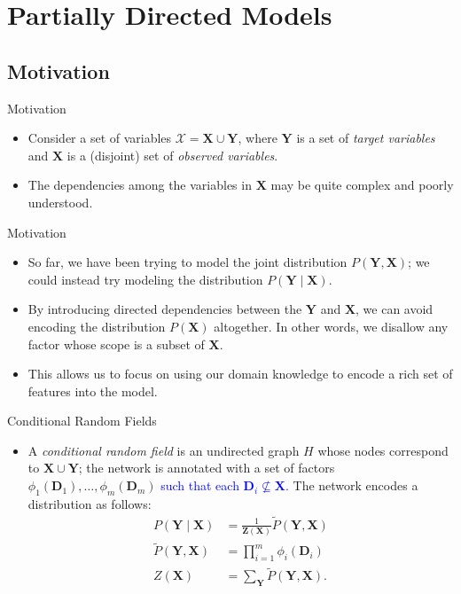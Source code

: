 \documentclass[11pt]{beamer}
\begin{document}
\section{Partially Directed Models \cite{pgmbook}}
\subsection{Motivation}

\begin{frame}{Motivation}
\begin{itemize}
	\item Consider a set of variables $\mathcal{X} = \boldsymbol{X} \cup
	\boldsymbol{Y}$, where $\boldsymbol{Y}$ is a set of \emph{target
	variables} and $\boldsymbol{X}$ is a (disjoint) set of \emph{observed
	variables}.
	\item The dependencies among the variables in $\boldsymbol{X}$ may be
	quite complex and poorly understood.
\end{itemize}
\end{frame}

\begin{frame}{Motivation}
\begin{itemize}
	\item So far, we have been trying to model the joint distribution
	$P(\boldsymbol{Y}, \boldsymbol{X})$; we could instead try modeling the
	distribution $P(\boldsymbol{Y} \;|\; \boldsymbol{X})$.
	\item By introducing directed dependencies between the $\boldsymbol{Y}$
	and $\boldsymbol{X}$, we can avoid encoding the distribution
	$P(\boldsymbol{X})$ altogether. In other words, we disallow any factor
	whose scope is a subset of $\boldsymbol{X}$.
	\item This allows us to focus on using our domain knowledge to encode a
	rich set of features into the model.
\end{itemize}
\end{frame}

\begin{frame}{Conditional Random Fields}
\begin{itemize}
	\item A \emph{conditional random field} is an undirected graph $H$ whose
	nodes correspond to $\boldsymbol{X} \cup \boldsymbol{Y}$; the network is
	annotated with a set of factors $\phi_{1}(\boldsymbol{D}_{1}), \ldots,
	\phi_{m}(\boldsymbol{D}_{m})$ \textcolor{blue}{such that each
	$\boldsymbol{D}_{i} \nsubseteq \boldsymbol{X}$.} The network encodes a
	distribution as follows:
	\begin{align*}
		P(\boldsymbol{Y} \;|\; \boldsymbol{X}) &=
		\frac{1}{\boldsymbol{Z}(\boldsymbol{X})}
		\tilde{P}(\boldsymbol{Y},\boldsymbol{X}) \\
		\tilde{P}(\boldsymbol{Y},\boldsymbol{X}) &=
		\prod_{i=1}^{m} \phi_{i}(\boldsymbol{D}_{i}) \\
		Z(\boldsymbol{X}) &= \sum_{\boldsymbol{Y}}
		\tilde{P}(\boldsymbol{Y}, \boldsymbol{X}).
	\end{align*}
\end{itemize}
\end{frame}
\end{document}
